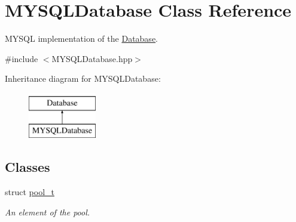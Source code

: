 \hypertarget{classMYSQLDatabase}{
\section{MYSQLDatabase Class Reference}
\label{classMYSQLDatabase}
}


MYSQL implementation of the \hyperlink{classDatabase}{Database}.  




{\ttfamily \#include $<$MYSQLDatabase.hpp$>$}

Inheritance diagram for MYSQLDatabase:\begin{figure}[H]
\begin{center}
\leavevmode
\includegraphics[height=2.000000cm]{classMYSQLDatabase}
\end{center}
\end{figure}
\subsection*{Classes}
\begin{DoxyCompactItemize}
\item 
struct \hyperlink{structMYSQLDatabase_1_1pool__t}{pool\_\-t}
\begin{DoxyCompactList}\small\item\em An element of the pool. \item\end{DoxyCompactList}\end{DoxyCompactItemize}
